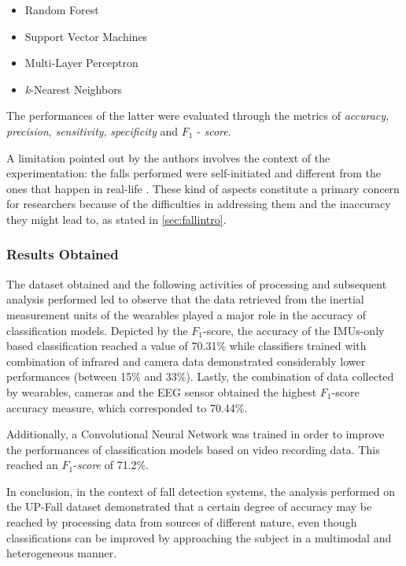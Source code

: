 \begin{itemize}
    \item Random Forest
    \item Support Vector Machines
    \item Multi-Layer Perceptron
    \item \textit{k}-Nearest Neighbors
\end{itemize}

The performances of the latter were evaluated through the metrics of \textit{accuracy}, \textit{precision}, \textit{sensitivity}, \textit{specificity} and $F_1$ - \textit{score}.

A limitation pointed out by the authors involves the context of the experimentation: the falls performed were self-initiated and different from the ones that happen in real-life  \cite{umafall}. These kind of aspects constitute a primary concern for researchers because of the difficulties in addressing them and the inaccuracy they might lead to, as stated in \ref{sec:fallintro}.

\subsubsection{Results Obtained}\label{subsubsec:upfall-results}

The dataset obtained and the following activities of processing and subsequent analysis performed led to observe that the data retrieved from the inertial measurement units of the wearables played a major role in the accuracy of classification models. Depicted by the $F_1$-score, the accuracy of the IMUs-only based classification reached a value of 70.31\% while classifiers trained with combination of infrared and camera data demonstrated considerably lower performances (between 15\% and 33\%). Lastly, the combination of data collected by wearables, cameras and the EEG sensor obtained the highest $F_1$-score accuracy measure, which corresponded to 70.44\%. 

Additionally, a Convolutional Neural Network was trained in order to improve the performances of classification models based on video recording data. This reached an $F_1$-\textit{score} of 71.2\%.

In conclusion, in the context of fall detection systems, the analysis performed on the UP-Fall dataset demonstrated that a certain degree of accuracy may be reached by processing data from sources of different nature, even though classifications can be improved by approaching the subject in a multimodal and heterogeneous manner.


